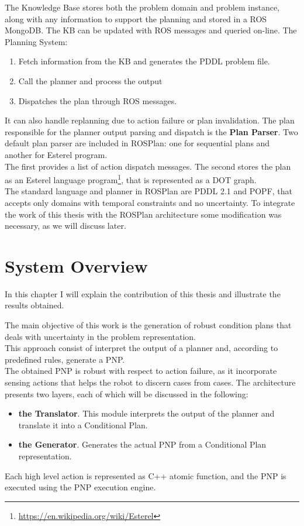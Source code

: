 \documentclass[pdftex,12pt,a4paper]{report}
\begin{document}
\noindent The Knowledge Base stores both the problem domain and problem instance, along with any information to support the planning and stored in a ROS MongoDB. The KB can be updated with ROS messages and queried on-line.
\newpage
\noindent The Planning System:
\begin{enumerate}
\item Fetch information from the KB and generates the PDDL problem file.
\item Call the planner and process the output
\item Dispatches the plan through ROS messages.
\end{enumerate}  
It can also handle replanning due to action failure or plan invalidation. The plan responsible for the planner output parsing and dispatch is the \textbf{Plan Parser}. Two default plan parser are included in ROSPlan: one for sequential plans and another for Esterel program. \\
The first provides a list of action dispatch messages. The second stores the plan as an Esterel language program\footnote{\url{https://en.wikipedia.org/wiki/Esterel}}, that is represented as a DOT graph. \\

\noindent The standard language and planner in ROSPlan are PDDL 2.1 and POPF\cite{coles2010forward},%
that accepts only domains with temporal constraints and no uncertainty. To integrate the work of this thesis with the ROSPlan architecture some modification was necessary, as we will discuss later.

\chapter{System Overview}\label{sec:system}
In this chapter I will explain the contribution of this thesis and illustrate the results obtained.\\
\newline

\noindent The main objective of this work is the generation of robust condition plans that deals with uncertainty in the problem representation.\\
This approach consist of interpret the output of a planner and, according to predefined rules, generate a PNP.\\
The obtained PNP is robust with respect to action failure, as it incorporate sensing actions that helps the robot to discern cases from cases.
The architecture presents two layers, each of which will be discussed in the following:
\begin{itemize}
\item \textbf{the Translator}. This module interprets the output of the planner and translate it into a Conditional Plan.
\item \textbf{the Generator}. Generates the actual PNP from a Conditional Plan representation.
\end{itemize}
Each high level action is represented as C++ atomic function, and the PNP is executed using the PNP execution engine.
\end{document}
